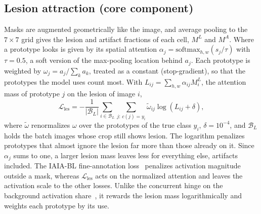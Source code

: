 \documentclass[conference]{IEEEtran}
\newcommand{\Lles}{\mathcal{L}_{\mathrm{les}}}
\begin{document}
\subsection{Lesion attraction (core component)}
Masks are augmented geometrically like the image, and average pooling to the $7\times7$ grid gives the lesion and artifact fractions of each cell, $M^L$ and $M^A$. Where a prototype looks is given by its spatial attention $\alpha_j=\mathrm{softmax}_{h,w}(s_j/\tau)$ with $\tau=0.5$, a soft version of the max-pooling location behind $a_j$. Each prototype is weighted by $\omega_j=a_j/\sum_k a_k$, treated as a constant (stop-gradient), so that the prototypes the model uses count most. With $L_{ij}=\sum_{h,w}\alpha_{ij}M^L_i$, the attention mass of prototype $j$ on the lesion of image $i$,
\begin{equation}
\Lles=-\frac{1}{|\mathcal{B}_L|}\sum_{i\in\mathcal{B}_L}\sum_{j:\,c(j)=y_i}\tilde{\omega}_{ij}\log\left(L_{ij}+\delta\right),
\end{equation}
where $\tilde{\omega}$ renormalizes $\omega$ over the prototypes of the true class $y_i$, $\delta=10^{-4}$, and $\mathcal{B}_L$ holds the batch images whose crop still shows lesion. The logarithm penalizes prototypes that almost ignore the lesion far more than those already on it. Since $\alpha_j$ sums to one, a larger lesion mass leaves less for everything else, artifacts included. The IAIA-BL fine-annotation loss~\cite{barnett2021,correia2023} penalizes activation magnitude outside a mask, whereas $\Lles$ acts on the normalized attention and leaves the activation scale to the other losses. Unlike the concurrent hinge on the background activation share~\cite{lin2026}, it rewards the lesion mass logarithmically and weights each prototype by its use.
\end{document}
